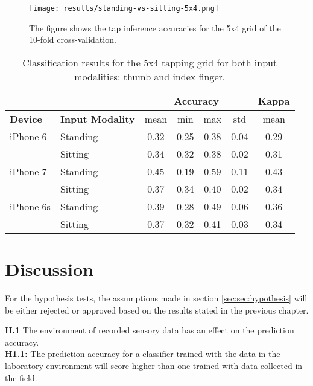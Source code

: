 \begin{figure}[h!]
  \centering
  \texttt{[image: results/standing-vs-sitting-5x4.png]}
  \caption{The figure shows the tap inference accuracies for the 5x4 grid of the 10-fold cross-validation.} \label{fig:bodypos5x4}
\end{figure}

\begin{table}[h!]
  \centering
\begin{tabular}{|l|l|c|c|c|c|c|}
  \cline{3-7}
  \multicolumn{2}{c}{} & \multicolumn{4}{|c|}{\textbf{Accuracy}} & \textbf{Kappa} \\
  \hline
  \textbf{Device} & \textbf{Input Modality} & mean &   min &   max  & std &  mean \\
  \hline
  iPhone 6 & Standing &      0.32 &     0.25 &     0.38 &     0.04 &        0.29 \\
  & Sitting &      0.34 &     0.32 &     0.38 &     0.02 &        0.31 \\
  \hline
iPhone 7 & Standing &      0.45 &     0.19 &     0.59 &     0.11 &        0.43 \\
  & Sitting &      0.37 &     0.34 &     0.40 &     0.02 &        0.34 \\
  \hline
iPhone 6s & Standing &      0.39 &     0.28 &     0.49 &     0.06 &        0.36 \\
  & Sitting &      0.37 &     0.32 &     0.41 &     0.03 &        0.34 \\
  \hline
\end{tabular}
  \caption{Classification results for the 5x4 tapping grid for both input modalities: thumb and index finger.}
\end{table}


\section{Discussion}
For the hypothesis tests, the assumptions made in section \ref{sec:sec:hypothesis} will be either rejected or approved based on the results stated in the previous chapter.

\begin{center}
  \begin{framed}
    \textbf{H.1}  The environment of recorded sensory data has an effect on the prediction accuracy.\\
    \textbf{H1.1:} The prediction accuracy for a classifier trained with the data in the laboratory environment will score higher than one trained with data collected in the field.
  \end{framed}
\end{center}

